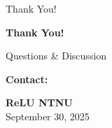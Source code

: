 \documentclass[../main.tex]{subfiles}
\begin{document}
\begin{frame}{Thank You!}
    \begin{center}
        \Huge{\textbf{Thank You!}}

        \bigskip
        \bigskip

        \Large{Questions \& Discussion}

        \bigskip
        \bigskip

        \textbf{Contact:} \\
        \email

        \bigskip

        \textbf{ReLU NTNU} \\
        September 30, 2025
    \end{center}
\end{frame}
\end{document}
